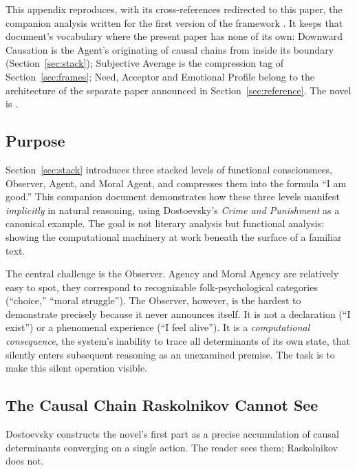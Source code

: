 This appendix reproduces, with its cross-references redirected to this paper, the companion analysis
written for the first version of the framework \citep{synthea2026}. It keeps that document's
vocabulary where the present paper has none of its own: Downward Causation is the Agent's originating
of causal chains from inside its boundary (Section~\ref{sec:stack}); Subjective Average is the
compression tag of Section~\ref{sec:frames}; Need, Acceptor and Emotional Profile belong to the
architecture of the separate paper announced in Section~\ref{sec:reference}. The novel is
\citet{dostoevsky1866}.




\subsection*{Purpose}


Section~\ref{sec:stack} introduces three stacked levels of functional consciousness,  Observer, Agent, and Moral Agent,  and compresses them into the formula ``I am good.'' This companion document demonstrates how these three levels manifest \emph{implicitly} in natural reasoning, using Dostoevsky's \emph{Crime and Punishment} as a canonical example. The goal is not literary analysis but functional analysis: showing the computational machinery at work beneath the surface of a familiar text.

The central challenge is the Observer. Agency and Moral Agency are relatively easy to spot,  they correspond to recognizable folk-psychological categories (``choice,'' ``moral struggle''). The Observer, however, is the hardest to demonstrate precisely because it never announces itself. It is not a declaration (``I exist'') or a phenomenal experience (``I feel alive''). It is a \emph{computational consequence},  the system's inability to trace all determinants of its own state,  that silently enters subsequent reasoning as an unexamined premise. The task is to make this silent operation visible.



\subsection*{The Causal Chain Raskolnikov Cannot See}


Dostoevsky constructs the novel's first part as a precise accumulation of causal determinants converging on a single action. The reader sees them; Raskolnikov does not.

